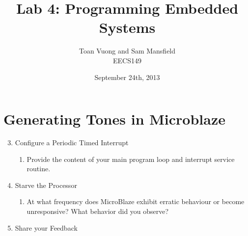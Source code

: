 \documentclass[10pt]{article}
\begin{document}
  \title{Lab 4: Programming Embedded Systems}
  \author{Toan Vuong and Sam Mansfield\\
          EECS149}
  \date{September 24th, 2013}
  \maketitle

  \section*{Generating Tones in Microblaze}
    \begin{enumerate}
      \setcounter{enumi}{2}
      \item Configure a Periodic Timed Interrupt 
        \begin{enumerate}
          \item Provide the content of your main program loop and interrupt service routine.\\[1em]
        \end{enumerate}

      \item Starve the Processor
        \begin{enumerate}
          \item At what frequency does MicroBlaze exhibit erratic behaviour or become unresponsive? What behavior did you observe?\\[1em]
        \end{enumerate}

      \item Share your Feedback\\[1em]
    \end{enumerate}
\end{document}
